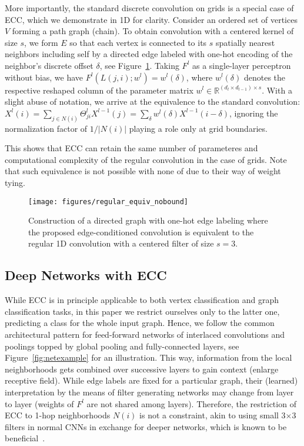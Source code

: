 \documentclass[10pt,twocolumn,letterpaper]{article}
\begin{document}
More importantly, the standard discrete convolution on grids is a special case of ECC, which we demonstrate in 1D for clarity. Consider an ordered set of vertices $V$ forming a path graph (chain). To obtain convolution with a centered kernel of size $s$, we form $E$ so that each vertex is connected to its $s$ spatially nearest neighbors including self by a directed edge labeled with one-hot encoding of the neighbor's discrete offset $\delta$, see Figure~\ref{fig:regularequiv}. Taking $F^l$ as a single-layer perceptron without bias, we have $F^l(L(j,i);w^l) = w^l(\delta)$, where $w^l(\delta)$ denotes the respective reshaped column of the parameter matrix $w^l\in \mathbb{R}^{(d_l\times d_{l-1})\times s}$. With a slight abuse of notation, we arrive at the equivalence to the standard convolution: $X^l(i) = \sum_{j\in N(i)} \Theta_{ji}^l X^{l-1}(j) = \sum_{\delta} w^l(\delta) X^{l-1}(i-\delta)$, ignoring the normalization factor of $1/|N(i)|$ playing a role only at grid boundaries.

This shows that ECC can retain the same number of parameteres and computational complexity of the regular convolution in the case of grids. Note that such equivalence is not possible with none of \cite{dcnn,kipf,duvenaud} due to their way of weight tying.

\begin{figure}[bt]
\centering
\texttt{[image: figures/regular\_equiv\_nobound]}
\vspace{1.5ex}
\caption{\label{fig:regularequiv} Construction of a directed graph with one-hot edge labeling where the proposed edge-conditioned convolution is equivalent to the regular 1D convolution with a centered filter of size $s=3$.}
\end{figure}


\subsection{Deep Networks with ECC}  \label{subsec:eccnet}

While ECC is in principle applicable to both vertex classification and graph classification tasks, in this paper we restrict ourselves only to the latter one, \ie predicting a class for the whole input graph. Hence, we follow the common architectural pattern for feed-forward networks of interlaced convolutions and poolings topped by global pooling and fully-connected layers, see Figure~\ref{fig:netexample} for an illustration. This way, information from the local neighborhoods gets combined over successive layers to gain context (enlarge receptive field). While edge labels are fixed for a particular graph, their (learned) interpretation by the means of filter generating networks may change from layer to layer (weights of $F^l$ are not shared among layers). Therefore, the restriction of ECC to 1-hop neighborhoods $N(i)$ is not a constraint, akin to using small 3$\times$3 filters in normal CNNs in exchange for deeper networks, which is known to be beneficial~\cite{hesun14}.
\end{document}
